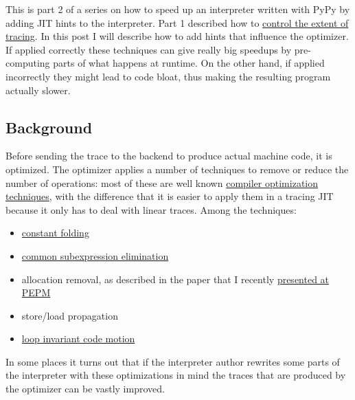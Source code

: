 \documentclass{sig-alternate}
\begin{document}
This is part 2 of a series on how to speed up an interpreter written with PyPy
by adding JIT hints to the interpreter. Part 1 described how to \href{http://morepypy.blogspot.com/2011/03/controlling-tracing-of-interpreter-with.html}{control the
extent of tracing}. In this post I will describe how to add hints that
influence the optimizer.  If applied correctly these techniques can give
really big speedups by pre-computing parts of what happens at runtime. On the other
hand, if applied incorrectly they might lead to code bloat, thus making the
resulting program actually slower.



\subsection{Background}

Before sending the trace to the backend to produce actual machine code, it is
optimized.  The optimizer applies a number of techniques to remove or reduce
the number of operations: most of these are well known \href{http://en.wikipedia.org/wiki/Compiler_optimization\#Optimization_techniques}{compiler optimization
techniques}, with the difference that it is easier to apply them in a tracing
JIT because it only has to deal with linear traces.  Among the techniques:
%
\begin{itemize}

\item \href{http://en.wikipedia.org/wiki/Constant_folding}{constant folding}

\item \href{http://en.wikipedia.org/wiki/Common_subexpression_elimination}{common subexpression elimination}

\item allocation removal, as described in the paper that I recently \href{http://morepypy.blogspot.com/2011/03/us-trip-report-popl-microsoft-ibm.html}{presented at
PEPM}

\item store/load propagation

\item \href{http://morepypy.blogspot.com/2011/01/loop-invariant-code-motion.html}{loop invariant code motion}

\end{itemize}

In some places it turns out that if the interpreter author rewrites some parts
of the interpreter with these optimizations in mind the traces that are produced
by the optimizer can be vastly improved.
\end{document}
